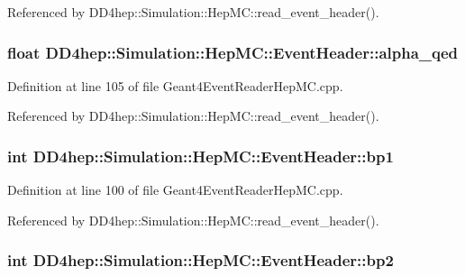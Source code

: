 Referenced by DD4hep::Simulation::HepMC::read\_\-event\_\-header().\hypertarget{class_d_d4hep_1_1_simulation_1_1_hep_m_c_1_1_event_header_a6ca0fb3012c13d65f7bc3ea095d41a73}{
\subsubsection[{alpha\_\-qed}]{\setlength{\rightskip}{0pt plus 5cm}float {\bf DD4hep::Simulation::HepMC::EventHeader::alpha\_\-qed}}}
\label{class_d_d4hep_1_1_simulation_1_1_hep_m_c_1_1_event_header_a6ca0fb3012c13d65f7bc3ea095d41a73}


Definition at line 105 of file Geant4EventReaderHepMC.cpp.

Referenced by DD4hep::Simulation::HepMC::read\_\-event\_\-header().\hypertarget{class_d_d4hep_1_1_simulation_1_1_hep_m_c_1_1_event_header_a5c029c436a958d9903c9296823ed2195}{
\subsubsection[{bp1}]{\setlength{\rightskip}{0pt plus 5cm}int {\bf DD4hep::Simulation::HepMC::EventHeader::bp1}}}
\label{class_d_d4hep_1_1_simulation_1_1_hep_m_c_1_1_event_header_a5c029c436a958d9903c9296823ed2195}


Definition at line 100 of file Geant4EventReaderHepMC.cpp.

Referenced by DD4hep::Simulation::HepMC::read\_\-event\_\-header().\hypertarget{class_d_d4hep_1_1_simulation_1_1_hep_m_c_1_1_event_header_a4b3d20b78f49d539c6487d2a5eeb844c}{
\subsubsection[{bp2}]{\setlength{\rightskip}{0pt plus 5cm}int {\bf DD4hep::Simulation::HepMC::EventHeader::bp2}}}
\label{class_d_d4hep_1_1_simulation_1_1_hep_m_c_1_1_event_header_a4b3d20b78f49d539c6487d2a5eeb844c}


